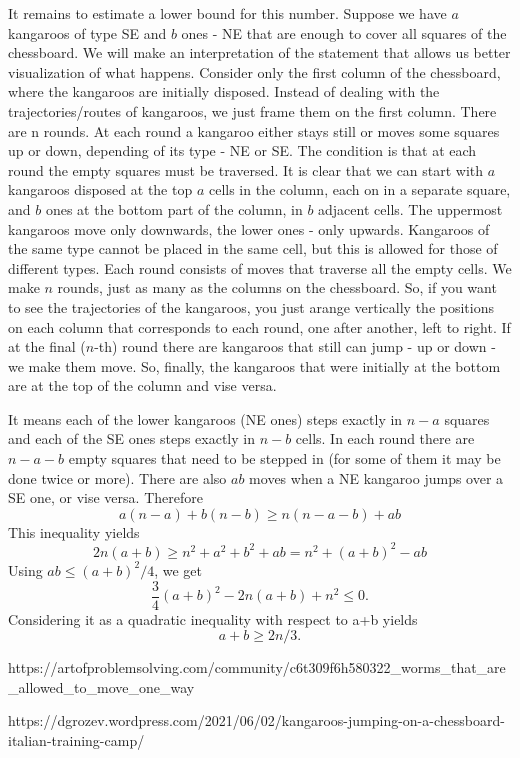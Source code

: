 \begin{shortque*}{}
{        It remains to estimate a lower bound for this number. Suppose we have $a$ kangaroos of type SE and $b$ ones - NE that are enough to cover all squares of the chessboard. We will make an interpretation of the statement that allows us better visualization of what happens. Consider only the first column of the chessboard, where the kangaroos are initially disposed. Instead of dealing with the trajectories/routes of kangaroos, we just frame them on the first column. There are n rounds. At each round a kangaroo either stays still or moves some squares up or down, depending of its type - NE or SE. The condition is that at each round the empty squares must be traversed. It is clear that we can start with $a$ kangaroos disposed at the top $a$ cells in the column, each on in a separate square, and $b$ ones at the bottom part of the column, in $b$ adjacent cells. The uppermost kangaroos move only downwards, the lower ones - only upwards. Kangaroos of the same type cannot be placed in the same cell, but this is allowed for those of different types. Each round consists of moves that traverse all the empty cells. We make $n$ rounds, just as many as the columns on the chessboard. So, if you want to see the trajectories of the kangaroos, you just arange vertically the positions on each column that corresponds to each round, one after another, left to right. If at the final ($n$-th) round there are kangaroos that still can jump - up or down - we make them move. So, finally, the kangaroos that were initially at the bottom are at the top of the column and vise versa. 

        It means each of the lower kangaroos (NE ones) steps exactly in $n-a$ squares and each of the SE ones steps exactly in $n-b$ cells. In each round there are $n-a-b$ empty squares that need to be stepped in (for some of them it may be done twice or more). There are also $ab$ moves when a NE kangaroo jumps over a SE one, or vise versa. Therefore
        \[\displaystyle a(n-a)+b(n-b)\ge n(n-a-b)+ab \]
        This inequality yields
        \[\displaystyle 2n(a+b)\ge n^2+a^2+b^2+ab=n^2+(a+b)^2-ab\]
        Using $ab\leq (a+b)^2/4$, we get
        \[\displaystyle \frac{3}{4}(a+b)^2-2n(a+b)+n^2\le 0.\]
        Considering it as a quadratic inequality with respect to a+b yields
        \[a+b\ge 2n/3.\]
        }{%
        https://artofproblemsolving.com/community/c6t309f6h580322_worms_that_are_allowed_to_move_one_way

        https://dgrozev.wordpress.com/2021/06/02/kangaroos-jumping-on-a-chessboard-italian-training-camp/
    }


\end{shortque*}

